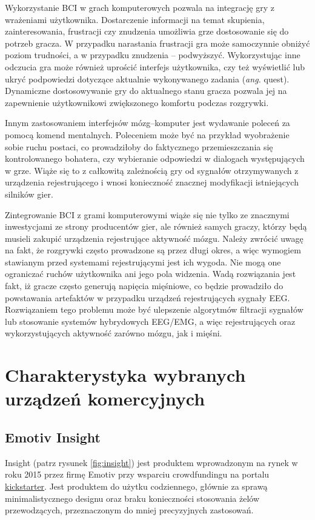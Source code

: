 \documentclass[skorowidz,skroty]{dyplomWEZUT}
\begin{document}
Wykorzystanie BCI w grach komputerowych pozwala na integrację gry z wrażeniami użytkownika. Dostarczenie informacji na temat skupienia, zainteresowania, frustracji czy znudzenia umożliwia grze dostosowanie się do potrzeb gracza. W przypadku narastania frustracji gra może samoczynnie obniżyć poziom trudności, a w przypadku znudzenia -- podwyższyć. Wykorzystując inne odczucia gra może również uprościć interfejs użytkownika, czy też wyświetlić lub ukryć podpowiedzi dotyczące aktualnie wykonywanego zadania (\textit{ang.} quest). Dynamiczne dostosowywanie gry do aktualnego stanu gracza pozwala jej na zapewnienie użytkownikowi zwiększonego komfortu podczas rozgrywki.

Innym zastosowaniem interfejsów mózg--komputer jest wydawanie poleceń za pomocą komend mentalnych. Poleceniem może być na przykład wyobrażenie sobie ruchu postaci, co prowadziłoby do faktycznego przemieszczania się kontrolowanego bohatera, czy wybieranie odpowiedzi w dialogach występujących w grze. Wiąże się to z całkowitą zależnością gry od sygnałów otrzymywanych z urządzenia rejestrującego i wnosi konieczność znacznej modyfikacji istniejących silników gier.

Zintegrowanie BCI z grami komputerowymi wiąże się nie tylko ze znacznymi inwestycjami ze strony producentów gier, ale również samych graczy, którzy będą musieli zakupić urządzenia rejestrujące aktywność mózgu. Należy zwrócić uwagę na fakt, że rozgrywki często prowadzone są przez długi okres, a więc wymogiem stawianym przed systemami rejestrującymi jest ich wygoda. Nie mogą one ograniczać ruchów użytkownika ani jego pola widzenia. Wadą rozwiązania jest fakt, iż gracze często generują napięcia mięśniowe, co będzie prowadziło do powstawania artefaktów w przypadku urządzeń rejestrujących sygnały EEG. Rozwiązaniem tego problemu może być ulepszenie algorytmów filtracji sygnałów lub stosowanie systemów hybrydowych EEG/EMG, a więc rejestrujących oraz wykorzystujących aktywność zarówno mózgu, jak i mięśni\cite{bci_introduction}.


\chapter{Charakterystyka wybranych urządzeń komercyjnych}
\section{Emotiv Insight\label{section:insight}}
Insight (patrz rysunek \vref{fig:insight}) jest produktem wprowadzonym na rynek w roku 2015 przez firmę Emotiv przy wsparciu crowdfundingu na portalu \href{www.kickstarter.com}{kickstarter}. Jest produktem do użytku codziennego, głównie za sprawą minimalistycznego designu oraz braku konieczności stosowania żelów przewodzących, przeznaczonym do mniej precyzyjnych zastosowań.
\end{document}
